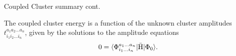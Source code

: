 \begin{frame}{Coupled Cluster summary cont.}

    The coupled cluster energy is a function of the unknown cluster amplitudes $t_{i_1i_2\ldots i_n}^{a_1a_2\ldots a_n}$,
    given by the solutions to the amplitude equations
    \begin{equation*}
        0 = \langle \Phi_{i_1 \ldots i_n}^{a_1 \ldots a_n} | \bar{\mathrm{H}} |\Phi_0\rangle.
    \end{equation*}
\end{frame}

    
